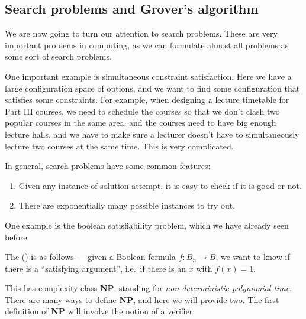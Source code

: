 \documentclass[a4paper]{article}
\begin{document}
\subsection{Search problems and Grover's algorithm}
We are now going to turn our attention to search problems. These are very important problems in computing, as we can formulate almost all problems as some sort of search problems.

One important example is simultaneous constraint satisfaction. Here we have a large configuration space of options, and we want to find some configuration that satisfies some constraints. For example, when designing a lecture timetable for Part III courses, we need to schedule the courses so that we don't clash two popular courses in the same area, and the courses need to have big enough lecture halls, and we have to make sure a lecturer doesn't have to simultaneously lecture two courses at the same time. This is very complicated.

In general, search problems have some common features:
\begin{enumerate}
  \item Given any instance of solution attempt, it is easy to check if it is good or not.
  \item There are exponentially many possible instances to try out.
\end{enumerate}

One example is the boolean satisfiability problem, which we have already seen before.
\begin{eg}
  The  () is as follows --- given a Boolean formula $f: B_n \to B$, we want to know if there is a ``satisfying argument'', i.e.\ if there is an $x$ with $f(x) = 1$.
\end{eg}

This has complexity class \textbf{NP}, standing for \emph{non-deterministic polynomial time}. There are many ways to define \textbf{NP}, and here we will provide two. The first definition of \textbf{NP} will involve the notion of a verifier:
\end{document}

